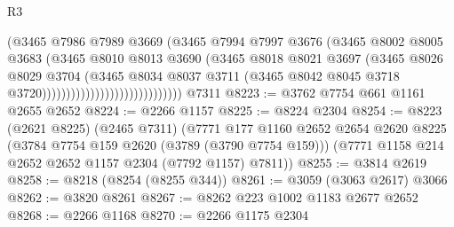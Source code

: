 \begin{lexlean}{R3}
\begin{coremodule}
                                              (@3465
                                                @7986
                                                @7989
                                                @3669
                                                (@3465
                                                  @7994
                                                  @7997
                                                  @3676
                                                  (@3465
                                                    @8002
                                                    @8005
                                                    @3683
                                                    (@3465
                                                      @8010
                                                      @8013
                                                      @3690
                                                      (@3465
                                                        @8018
                                                        @8021
                                                        @3697
                                                        (@3465
                                                          @8026
                                                          @8029
                                                          @3704
                                                          (@3465
                                                            @8034
                                                            @8037
                                                            @3711
                                                            (@3465
                                                              @8042
                                                              @8045
                                                              @3718
                                                              @3720)))))))))))))))))))))))))))))
    @7311
@8223 := @3762 @7754 @661 @1161 @2655 @2652
@8224 := @2266 @1157
@8225 := @8224 @2304
@8254 := @8223
    (@2621 @8225)
    (@2465 @7311)
    (@7771
      @177
      @1160
      @2652
      @2654
      @2620
      @8225
      (@3784 @7754 @159 @2620 (@3789 (@3790 @7754 @159)))
      (@7771 @1158 @214 @2652 @2652 @1157 @2304 (@7792 @1157) @7811))
@8255 := @3814 @2619
@8258 := @8218 (@8254 (@8255 @344))
@8261 := @3059 (@3063 @2617) @3066
@8262 := @3820 @8261
@8267 := @8262 @223 @1002 @1183 @2677 @2652
@8268 := @2266 @1168
@8270 := @2266 @1175 @2304

\end{coremodule}
\end{lexlean}
